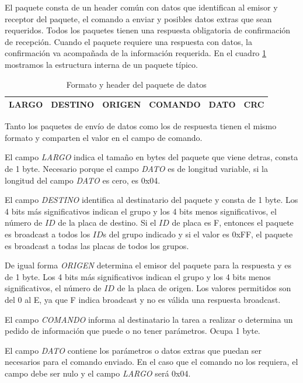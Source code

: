 El paquete consta de un header com\'un con datos que identifican al emisor y receptor del paquete, el comando a enviar y
posibles datos extras que sean requeridos.
Todos los paquetes tienen una respuesta obligatoria de confirmaci\'on de recepci\'on.
Cuando el paquete requiere una respuesta con datos, la confirmaci\'on va acompa\~nada de la informaci\'on requerida.
En el cuadro \ref{hF_comm_paquete_tabla} mostramos la estructura interna de un paquete t\'ipico.

\begin{table}[ht]
	\begin{center}
		\begin{tabular}{|c|c|c|c|c|c|}
			\hline
			LARGO & DESTINO & ORIGEN & COMANDO & DATO & CRC \\
			\hline
		\end{tabular}
	\caption{Formato y header del paquete de datos}
	\label{hF_comm_paquete_tabla}
	\end{center}
\end{table}

Tanto los paquetes de env\'io de datos como los de respuesta tienen el mismo formato y comparten el valor en el campo de comando.

El campo \emph{LARGO} indica el tama\~no en bytes del paquete que viene detras, consta de 1 byte.
Necesario porque el campo \emph{DATO} es de longitud variable, si la longitud del campo \emph{DATO} es cero, es 0x04.

El campo \emph{DESTINO} identifica al destinatario del paquete y consta de 1 byte.
Los 4 bits m\'as significativos indican el grupo y los 4 bits menos significativos, el n\'umero de $ID$ de la placa de destino.
Si el $ID$ de placa es F, entonces el paquete es broadcast a todos los $ID$s del grupo indicado y si el valor es 0xFF, el paquete
es broadcast a todas las placas de todos los grupos.

De igual forma \emph{ORIGEN} determina el emisor del paquete para la respuesta y es de 1 byte.
Los 4 bits m\'as significativos indican el grupo y los 4 bits menos significativos, el n\'umero de $ID$ de la placa de origen.
Los valores permitidos son del $0$ al E, ya que F indica broadcast y no es v\'alida una respuesta broadcast.

El campo \emph{COMANDO} informa al destinatario la tarea a realizar o determina un pedido de informaci\'on que puede o no
tener par\'ametros.
Ocupa 1 byte.

El campo \emph{DATO} contiene los par\'ametros o datos extras que puedan ser necesarios para el comando enviado.
En el caso que el comando no los requiera, el campo debe ser nulo y el campo \emph{LARGO} ser\'a 0x04.

